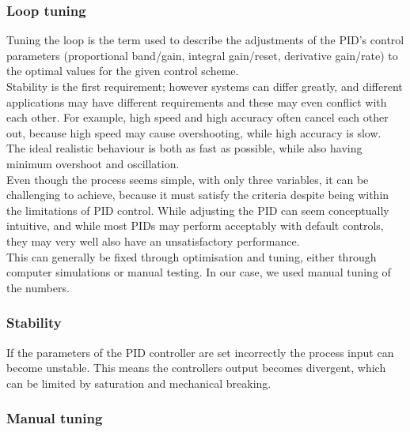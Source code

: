 \subsubsection {Loop tuning} 

Tuning the loop is the term used to describe the adjustments of the PID’s control parameters (proportional band/gain, integral gain/reset, derivative gain/rate) to the optimal values for the given control scheme. \\ Stability is the first requirement; however systems can differ greatly, and different applications may have different requirements and these may even conflict with each other. For example, high speed and high accuracy often cancel each other out, because high speed may cause overshooting, while high accuracy is slow.\\ The ideal realistic behaviour is both as fast as possible, while also having minimum overshoot and oscillation. \\ 

Even though the process seems simple, with only three variables, it can be challenging to achieve, because it must satisfy the criteria despite being within the limitations of PID control. While adjusting the PID can seem conceptually intuitive, and while most PIDs may perform acceptably with default controls, they may very well also have an unsatisfactory performance.\\ This can generally be fixed through optimisation and tuning, either through computer simulations or manual testing. In our case, we used manual tuning of the numbers.

\subsubsection {Stability} 

If the parameters of the PID controller are set incorrectly the process input can become unstable.
This means the controllers output becomes divergent, which can be limited by saturation and mechanical breaking. \\

\subsubsection {Manual tuning} 

